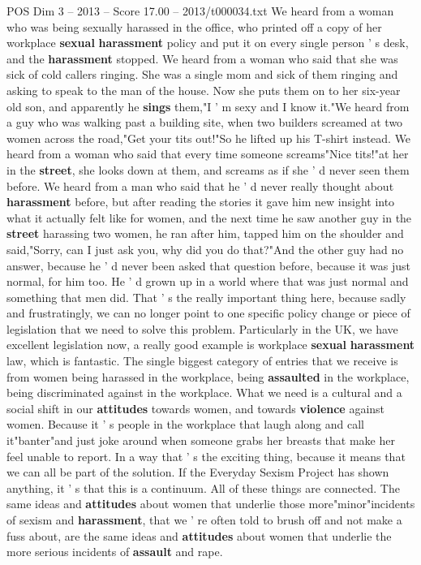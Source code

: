 \begin{textsample}{POS Dim 3 – 2013 – Score 17.00 – 2013/t000034.txt}
We heard from a woman who was being sexually harassed in the office, who printed off a copy of her workplace \textbf{sexual} \textbf{harassment} policy and put it on every single person ' s desk, and the \textbf{harassment} stopped.
We heard from a woman who said that she was sick of cold callers ringing.
She was a single mom and sick of them ringing and asking to speak to the man of the house.
Now she puts them on to her six-year old son, and apparently he \textbf{sings} them,"I ' m sexy and I know it."We heard from a guy who was walking past a building site, when two builders screamed at two women across the road,"Get your tits out!"So he lifted up his T-shirt instead.
We heard from a woman who said that every time someone screams"Nice tits!"at her in the \textbf{street}, she looks down at them, and screams as if she ' d never seen them before.
We heard from a man who said that he ' d never really thought about \textbf{harassment} before, but after reading the stories it gave him new insight into what it actually felt like for women, and the next time he saw another guy in the \textbf{street} harassing two women, he ran after him, tapped him on the shoulder and said,"Sorry, can I just ask you, why did you do that?"And the other guy had no answer, because he ' d never been asked that question before, because it was just normal, for him too.
He ' d grown up in a world where that was just normal and something that men did.
That ' s the really important thing here, because sadly and frustratingly, we can no longer point to one specific policy change or piece of legislation that we need to solve this problem.
Particularly in the UK, we have excellent legislation now, a really good example is workplace \textbf{sexual} \textbf{harassment} law, which is fantastic.
The single biggest category of entries that we receive is from women being harassed in the workplace, being \textbf{assaulted} in the workplace, being discriminated against in the workplace.
What we need is a cultural and a social shift in our \textbf{attitudes} towards women, and towards \textbf{violence} against women.
Because it ' s people in the workplace that laugh along and call it"banter"and just joke around when someone grabs her breasts that make her feel unable to report.
In a way that ' s the exciting thing, because it means that we can all be part of the solution.
If the Everyday Sexism Project has shown anything, it ' s that this is a continuum.
All of these things are connected.
The same ideas and \textbf{attitudes} about women that underlie those more"minor"incidents of sexism and \textbf{harassment}, that we ' re often told to brush off and not make a fuss about, are the same ideas and \textbf{attitudes} about women that underlie the more serious incidents of \textbf{assault} and rape.

\end{textsample}
